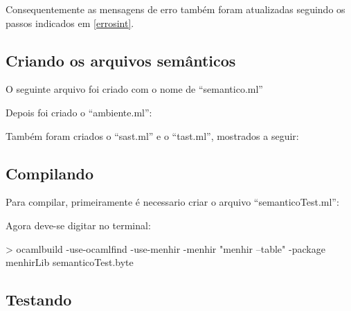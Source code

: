 \documentclass[12pt,a4paper]{report}
\begin{document}






Consequentemente as mensagens de erro também foram atualizadas seguindo os passos indicados em \ref{errosint}.


\subsection{Criando os arquivos semânticos}

O seguinte arquivo foi criado com o nome de ``semantico.ml''



Depois foi criado o ``ambiente.ml'':




Também foram criados o ``sast.ml'' e o ``tast.ml'', mostrados a seguir:






\subsection{Compilando}

Para compilar, primeiramente é necessario criar o arquivo ``semanticoTest.ml'':



Agora deve-se digitar no terminal: 

\begin{terminal}
> ocamlbuild -use-ocamlfind -use-menhir -menhir "menhir --table" -package menhirLib semanticoTest.byte
\end{terminal}

\subsection{Testando}
\end{document}
